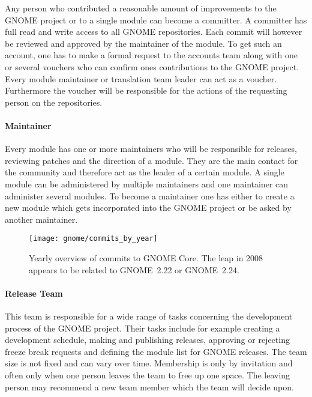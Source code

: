 Any person who contributed a reasonable amount of improvements to the GNOME
project or to a single module can become a committer. A committer has full read
and write access to all GNOME repositories. Each commit will however be
reviewed and approved by the maintainer of the module. To get such an account,
one has to make a formal request to the accounts team along with one or several
vouchers who can confirm ones contributions to the GNOME project. Every module
maintainer or translation team leader can act as a voucher. Furthermore the
voucher will be responsible for the actions of the requesting person on the
repositories.

\paragraph{Maintainer}

Every module has one or more maintainers who will be responsible for releases,
reviewing patches and the direction of a module. They are the main contact for
the community and therefore act as the leader of a certain module. A single
module can be administered by multiple maintainers and one maintainer can
administer several modules. To become a maintainer one has either to create a
new module which gets incorporated into the GNOME project or be asked by
another maintainer.

\begin{figure}[htbp]
  \centering
  \texttt{[image: gnome/commits\_by\_year]}
  \caption[Commits by Year, GNOME]
  {Yearly overview of commits to GNOME Core. The leap in 2008 appears to be
    related to GNOME~2.22 or GNOME~2.24.}
  \label{fig:gnome:cby}
\end{figure}

\paragraph{Release Team}

This team is responsible for a wide range of tasks concerning the development
process of the GNOME project. Their tasks include for example creating a
development schedule, making and publishing releases, approving or rejecting
freeze break requests and defining the module list for GNOME releases. The team
size is not fixed and can vary over time. Membership is only by invitation and
often only when one person leaves the team to free up one space. The leaving
person may recommend a new team member which the team will decide upon.

